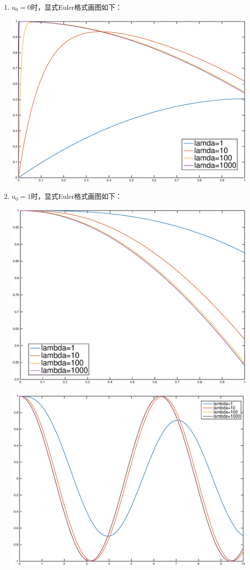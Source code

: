 \documentclass{ctexart}
\begin{document}
\begin{enumerate}
\begin{enumerate}
\begin{enumerate}

\item \(u_0=0\)时，显式Euler格式画图如下：

\centerline{\includegraphics[width=5.5in]{X0.eps}}

\item \(u_0=1\)时，显式Euler格式画图如下：

\centerline{\includegraphics[width=5.5in]{2_1.eps}}
\centerline{\includegraphics[width=5.5in]{2_2.eps}}


\end{enumerate}
\end{enumerate}
\end{enumerate}
\end{document}
